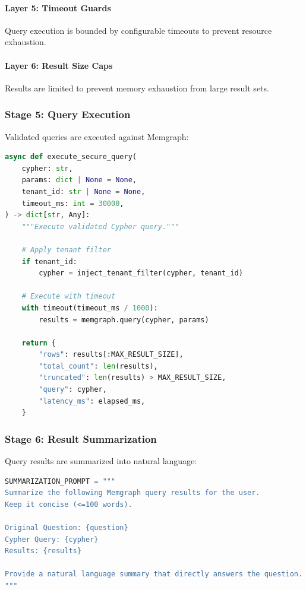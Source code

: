 \paragraph{Layer 5: Timeout Guards} Query execution is bounded by configurable timeouts to prevent resource exhaustion.

\paragraph{Layer 6: Result Size Caps} Results are limited to prevent memory exhaustion from large result sets.

\subsubsection{Stage 5: Query Execution}

Validated queries are executed against Memgraph:

\begin{lstlisting}[language=Python, caption={Secure query execution}, label=lst:query-execution]
async def execute_secure_query(
    cypher: str,
    params: dict | None = None,
    tenant_id: str | None = None,
    timeout_ms: int = 30000,
) -> dict[str, Any]:
    """Execute validated Cypher query."""
    
    # Apply tenant filter
    if tenant_id:
        cypher = inject_tenant_filter(cypher, tenant_id)
    
    # Execute with timeout
    with timeout(timeout_ms / 1000):
        results = memgraph.query(cypher, params)
    
    return {
        "rows": results[:MAX_RESULT_SIZE],
        "total_count": len(results),
        "truncated": len(results) > MAX_RESULT_SIZE,
        "query": cypher,
        "latency_ms": elapsed_ms,
    }
\end{lstlisting}

\subsubsection{Stage 6: Result Summarization}

Query results are summarized into natural language:

\begin{lstlisting}[language=Python, caption={Result summarization}, label=lst:result-summarization]
SUMMARIZATION_PROMPT = """
Summarize the following Memgraph query results for the user.
Keep it concise (<=100 words).

Original Question: {question}
Cypher Query: {cypher}
Results: {results}

Provide a natural language summary that directly answers the question.
"""
\end{lstlisting}


